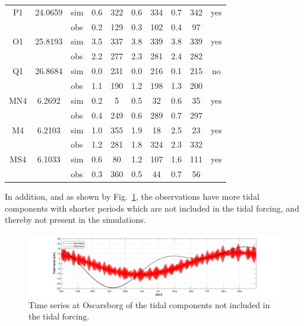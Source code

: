 \begin{table}[t]
\begin{tabular}{|c|c|l|cc|cc|cc|c|}
\small P1   & \small 24.0659 	& sim & 0.6 & 322 & 0.6 & 334 & 0.7 & 342 & yes  \\
\small      &        	& obs & 0.2 & 129 & 0.3 & 102 & 0.4 & 97 &    \\
\small O1   & \small 25.8193 	& sim & 3.5 & 337 & 3.8 & 339 & 3.8 & 339 & yes  \\
\small      &        	& obs & 2.2 & 277 & 2.3 & 281 & 2.4 & 282 &    \\
\small Q1   & \small 26.8684 	& sim & 0.0 & 231 & 0.0 & 216 & 0.1 & 215 & no   \\
\small      &        	& obs & 1.1 & 190 & 1.2 & 198 & 1.3 & 200 &    \\
\small MN4  & \small 6.2692 	& sim & 0.2 & 5 & 0.5 & 32 & 0.6 & 35 & yes  \\
\small      &        	& obs & 0.4 & 249 & 0.6 & 289 & 0.7 & 297 &    \\
\small M4   & \small 6.2103 	& sim & 1.0 & 355 & 1.9 & 18 & 2.5 & 23 & yes  \\
\small      &        	& obs & 1.2 & 281 & 1.8 & 324 & 2.3 & 332 &    \\
\small MS4  & \small 6.1033 	& sim & 0.6 & 80 & 1.2 & 107 & 1.6 & 111 & yes  \\
\small      &        	& obs & 0.3 & 360 & 0.5 & 44 & 0.7 & 56 &    \\
\hline
\end{tabular}
\end{table}

In addition, and as shown by Fig.~\ref{fig:Waterlevel_tide}, the observations have more tidal components with shorter periods which are not included in the tidal forcing, and thereby not present in the simulations. %

\begin{figure}[tbh] 
	\centerline{ \includegraphics*[trim=3cm 0cm 2.5cm 0cm,clip=true,width=\textwidth]{Figurer/Oscarsborg_Tide_not_included} } 
	\caption{\small Time series at Oscarsborg of the tidal components not included in the tidal forcing.} 
	\label{fig:Waterlevel_tide} 
\end{figure} 

